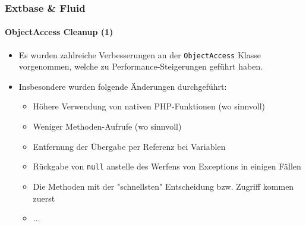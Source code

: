 
\begin{frame}[fragile]
	\frametitle{Extbase \& Fluid}
	\framesubtitle{ObjectAccess Cleanup (1)}

	\begin{itemize}

		\item Es wurden zahlreiche Verbesserungen an der \texttt{ObjectAccess} Klasse vorgenommen, welche zu Performance-Steigerungen geführt haben.
		\item Insbesondere wurden folgende Änderungen durchgeführt:

			\begin{itemize}
				\item Höhere Verwendung von nativen PHP-Funktionen (wo sinnvoll)
				\item Weniger Methoden-Aufrufe (wo sinnvoll)
				\item Entfernung der Übergabe per Referenz bei Variablen
				\item Rückgabe von \texttt{null} anstelle des Werfens von Exceptions in einigen Fällen
				\item Die Methoden mit der "schnellsten" Entscheidung bzw. Zugriff kommen zuerst
				\item ...
			\end{itemize}

	\end{itemize}

\end{frame}


